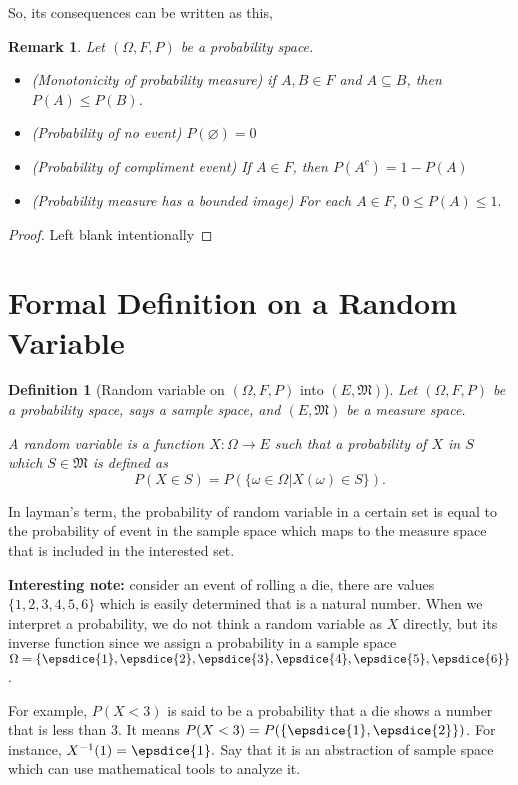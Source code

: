 \documentclass[12pt, a4paper]{report}
\newtheorem{definition}[theorem]{Definition}
\newtheorem{remark}{Remark}[theorem]
\begin{document}
    So, its consequences can be written as this,
    \begin{remark} Let $(\Omega, F, P)$ be a probability space.
        \begin{itemize}
            \item (Monotonicity of probability measure) if $A, B \in F$ and $A \subseteq B$, then $P(A) \leq P(B)$.
            \item (Probability of no event) $P(\varnothing) = 0$
            \item (Probability of compliment event) If $A\in F$, then $P(A^c) = 1-P(A)$
            \item (Probability measure has a bounded image) For each $A \in F$, $0 \leq P(A) \leq 1.$
        \end{itemize}
    \end{remark}
    \begin{proof} Left blank intentionally
    \end{proof}
    \section{Formal Definition on a Random Variable}
    \begin{definition}[Random variable on $(\Omega, F, P)$ into $(E, \mathfrak{M})$] Let $(\Omega, F, P)$ be a probability space, says a sample space, and $(E,\mathfrak{M})$ be a measure space.
        
    A random variable is a function $X: \Omega \rightarrow E$ such that a probability of $X$ in $S$ which $S \in \mathfrak{M}$ is defined as $$P(X\in S) = P(\{\omega \in \Omega | X(\omega) \in S\}).$$
    \end{definition}

    In layman's term, the probability of random variable in a certain set is equal to the probability of event in the sample space which maps to the measure space that is included in the interested set.

    \textbf{Interesting note:} consider an event of rolling a die, there are values $\{1,2,3,4,5,6\}$ which is easily determined that is a natural number. When we interpret a probability, we do not think a random variable as $X$ directly, but its inverse function since we assign a probability in a sample space $\Omega = \{\epsdice{1}, \epsdice{2}, \epsdice{3}, \epsdice{4}, \epsdice{5}, \epsdice{6}\}$.

    For example, $P(X < 3)$ is said to be a probability that a die shows a number that is less than 3. It means $P(X < 3) = P(\{\epsdice{1}, \epsdice{2}\})$. For instance, $X^{-1}(1) = \epsdice{1}.$ Say that it is an abstraction of sample space which can use mathematical tools to analyze it.
\end{document}
